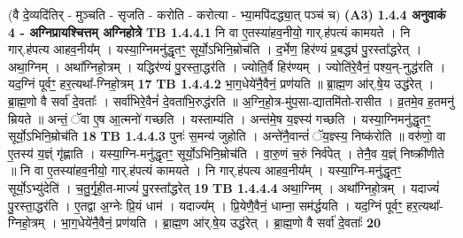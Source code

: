 \documentclass[17pt]{extarticle}
\begin{document}
                  \newline
                                    (वै दे॒व्यदि॑तिर् - मुञ्चति - सृजति - करोति - करोत्या - भ्या॒मपि॑दद्ध्या॒त् पञ्च॑ च) \textbf{(A3)} \newline \newline
                \textbf{ 1.4.4      अनुवाकं   4 - अग्निप्रायश्चित्तम् अग्निहोत्रे} \newline
                                \textbf{ TB 1.4.4.1} \newline
                  नि वा ए॒तस्या॑हव॒नीयो॒ गार्.ह॑पत्यं कामयते । नि गार्.ह॑पत्य आहव॒नीय᳚म् । यस्या॒ग्निमनु॑द्धृतꣳ॒॒ सूर्यो॒ऽभिनि॒म्रोच॑ति । द॒र्भेण॒ हिर॑ण्यं प्र॒बद्ध्य॑ पु॒रस्ता᳚द्धरेत् । अथा॒ग्निम् । अथा᳚ग्निहो॒त्रम् । यद्धिर॑ण्यं पु॒रस्ता॒द्धर॑ति । ज्योति॒र्वै हिर॑ण्यम् । ज्योति॑रे॒वैनं॒ पश्य॒न्-नुद्ध॑रति । यद॒ग्निं पूर्वꣳ॒॒ हर॒त्यथा᳚-ग्निहो॒त्रम् \textbf{ 17} \newline
                  \newline
                                \textbf{ TB 1.4.4.2} \newline
                  भा॒ग॒धेये॑नै॒वैनं॒ प्रण॑यति ॥ ब्रा॒ह्म॒ण आ॑र्.षे॒य उद्ध॑रेत् । ब्रा॒ह्म॒णो वै सर्वा॑ दे॒वताः᳚ । सर्वा॑भिरे॒वैनं॑ दे॒वता॑भि॒रुद्ध॑रति ॥ अ॒ग्नि॒हो॒त्र-मु॑प॒सा-द्यातमि॑तो-रासीत । व्र॒तमे॒व ह॒तमनु॑ म्रियते ॥ अन्तं॒ ॅवा ए॒ष आ॒त्मनो॑ गच्छति । यस्ताम्य॑ति । अन्त॑मे॒ष य॒ज्ञ्स्य॑ गच्छति । यस्या॒ग्निमनु॑द्धृतꣳ॒॒ सूर्यो॒ऽभिनि॒म्रोच॑ति \textbf{ 18} \newline
                  \newline
                                \textbf{ TB 1.4.4.3} \newline
                  पुनः॑ स॒मन्य॑ जुहोति । अन्ते॑नै॒वान्तं॑ ॅय॒ज्ञ्स्य॒ निष्क॑रोति ॥ वरु॑णो॒ वा ए॒तस्य॑ य॒ज्ञ्ं गृ॑ह्णाति । यस्या॒ग्नि-मनु॑द्धृतꣳ॒॒ सूर्यो॒ऽभिनि॒म्रोच॑ति । वा॒रु॒णं च॒रुं निर्व॑पेत् । तेनै॒व य॒ज्ञ्ं निष्क्री॑णीते ॥ नि वा ए॒तस्या॑हव॒नीयो॒ गार्.ह॑पत्यं कामयते । नि गार्.ह॑पत्य आहव॒नीय᳚म् । यस्या॒ग्नि-मनु॑द्धृतꣳ॒॒ सूर्यो॒ऽभ्यु॑देति॑ । च॒तु॒र्गृ॒ही॒त-माज्यं॑ पु॒रस्ता᳚द्धरेत् \textbf{ 19} \newline
                  \newline
                                \textbf{ TB 1.4.4.4} \newline
                  अथा॒ग्निम् । अथा᳚ग्निहो॒त्रम् । यदाज्यं॑ पु॒रस्ता॒द्धर॑ति । ए॒तद्वा अ॒ग्नेः प्रि॒यं धाम॑ । यदाज्य᳚म् । प्रि॒येणै॒वैनं॒ धाम्ना॒ सम॑र्द्धयति । यद॒ग्निं पूर्वꣳ॒॒ हर॒त्यथा᳚-ग्निहो॒त्रम् । भा॒ग॒धेये॑नै॒वैनं॒ प्रण॑यति । ब्रा॒ह्म॒ण आ॑र्.षे॒य उद्ध॑रेत् । ब्रा॒ह्म॒णो वै सर्वा॑ दे॒वताः᳚ \textbf{ 20} \newline
\end{document}
